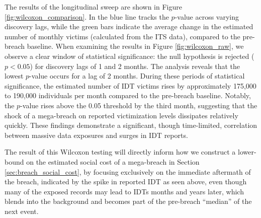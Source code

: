The results of the longitudinal sweep  are shown in Figure \ref{fig:wilcoxon_comparison}. In  the blue line tracks the $p$-value across varying discovery lags, while the green bars indicate the average change in the estimated number of monthly victims (calculated from the ITS  data), compared to the pre-breach baseline. When examining the results in Figure \ref{fig:wilcoxon_raw}, we observe a clear window of statistical significance: the null hypothesis is rejected ($p<0.05$) for discovery lags of 1 and 2 months. The analysis reveals that the lowest $p$-value occurs for a lag of 2 months. During these periods of statistical significance, the estimated number of IDT victims rises by approximately 175,000 to 190,000 individuals per month compared to the pre-breach baseline. Notably, the $p$-value rises above the 0.05 threshold by the third month, suggesting that the shock of a mega-breach on reported victimization levels dissipates relatively quickly. These findings demonstrate a significant, though time-limited, correlation between massive data exposures and surges in IDT reports. 

The result of this Wilcoxon testing will directly inform how we construct a lower-bound on the estimated social cost of a mega-breach in Section \ref{sec:breach_social_cost}, by focusing exclusively on the immediate aftermath of the breach, indicated by the spike in reported IDT as seen above, even though many of the exposed records may lead to IDTs months and years later, which blends into the background and becomes part of the pre-breach ``median'' of the next event.


